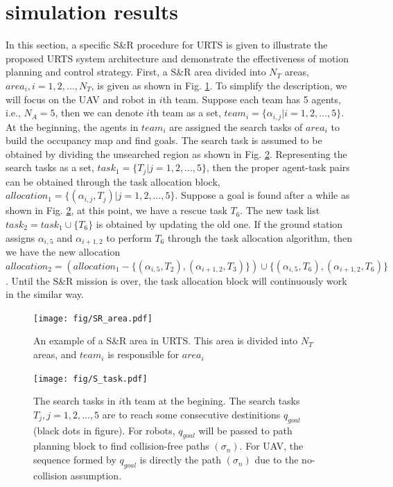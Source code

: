 \documentclass{ieeeaccess}
\begin{document}
\section{simulation results}
In this section, a specific S\&R procedure for URTS is given to illustrate the proposed URTS system architecture and demonstrate the effectiveness of motion planning and control strategy. First, a S\&R area divided into $N_T$ areas, $area_i,i=1,2,...,N_T$, is given as shown in Fig. \ref{fig:SR_area}. To simplify the description, we will focus on the UAV and robot in $i$th team. Suppose each team has 5 agents, i.e., $N_A=5$, then we can denote $i$th team as a set, $team_i=\{ \alpha_{i,j} | i=1,2,...,5 \}$. At the beginning, the agents in $team_i$ are assigned the search tasks of $area_i$ to build the occupancy map and find goals. The search task is assumed to be obtained by dividing the unsearched region as shown in Fig. \ref{fig:S_task}. Representing the search tasks as a set, $task_1=\{ T_j | j=1,2,...,5 \}$, then the proper agent-task pairs can be obtained through the task allocation block, $allocation_1=\{ (\alpha_{i,j},T_j) | j=1,2,...,5 \}$. Suppose a goal is found after a while as shown in Fig. \ref{fig:S_task}, at this point, we have a rescue task $T_6$. The new task list $task_2=task_1\cup\{ T_6 \}$ is obtained by updating the old one. If the ground station assigns $\alpha_{i,5}$ and $\alpha_{i+1,2}$ to perform $T_6$ through the task allocation algorithm, then we have the new allocation $allocation_2=(allocation_1-\{ (\alpha_{i,5},T_2),(\alpha_{i+1,2},T_3) \})\cup\{ (\alpha_{i,5},T_6),(\alpha_{i+1,2},T_6) \}$. Until the S\&R mission is over, the task allocation block will continuously work in the similar way.
\begin{figure}[htbp]
    \centering
    \texttt{[image: fig/SR\_area.pdf]}\caption{An example of a S\&R area in URTS. This area is divided into $N_T$ areas, and $team_i$ is responsible for $area_i$}%
    \label{fig:SR_area}
\end{figure}
\begin{figure}[htbp]
    \centering
    \texttt{[image: fig/S\_task.pdf]}\caption{The search tasks in $i$th team at the begining. The search tasks $T_j,j=1,2,...,5$ are to reach some consecutive destinitions $q_{goal}$ (black dots in figure). For robots, $q_{goal}$ will be passed to path planning block to find collision-free paths $(\sigma_n)$. For UAV, the sequence formed by $q_{goal}$ is directly the path $(\sigma_n)$ due to the no-collision assumption.}
    \label{fig:S_task}
\end{figure}
\end{document}
